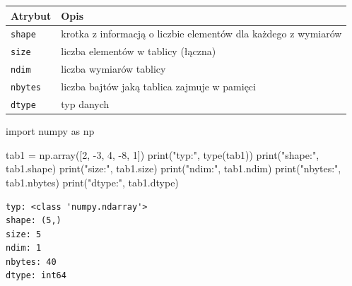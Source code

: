 \documentclass[
  letterpaper,
  DIV=11,
  numbers=noendperiod]{scrreprt}
\newenvironment{Shaded}{\begin{snugshade}}{\end{snugshade}}
\newcommand{\BuiltInTok}[1]{\textcolor[rgb]{0.00,0.23,0.31}{#1}}
\newcommand{\DecValTok}[1]{\textcolor[rgb]{0.68,0.00,0.00}{#1}}
\newcommand{\ImportTok}[1]{\textcolor[rgb]{0.00,0.46,0.62}{#1}}
\newcommand{\NormalTok}[1]{\textcolor[rgb]{0.00,0.23,0.31}{#1}}
\newcommand{\OperatorTok}[1]{\textcolor[rgb]{0.37,0.37,0.37}{#1}}
\newcommand{\StringTok}[1]{\textcolor[rgb]{0.13,0.47,0.30}{#1}}
\begin{document}
\begin{longtable}[]{@{}
  >{\raggedright\arraybackslash}p{}
  >{\raggedright\arraybackslash}p{}@{}}
\toprule\noalign{}
\begin{minipage}[b]{\linewidth}\raggedright
Atrybut
\end{minipage} & \begin{minipage}[b]{\linewidth}\raggedright
Opis
\end{minipage} \\
\midrule\noalign{}
\endhead
\bottomrule\noalign{}
\endlastfoot
\texttt{shape} & krotka z informacją o liczbie elementów dla każdego z
wymiarów \\
\texttt{size} & liczba elementów w tablicy (łączna) \\
\texttt{ndim} & liczba wymiarów tablicy \\
\texttt{nbytes} & liczba bajtów jaką tablica zajmuje w pamięci \\
\texttt{dtype} & typ danych \\
\end{longtable}

\begin{Shaded}
\begin{Highlighting}[]
\ImportTok{import}\NormalTok{ numpy }\ImportTok{as}\NormalTok{ np}

\NormalTok{tab1 }\OperatorTok{=}\NormalTok{ np.array([}\DecValTok{2}\NormalTok{, }\OperatorTok{{-}}\DecValTok{3}\NormalTok{, }\DecValTok{4}\NormalTok{, }\OperatorTok{{-}}\DecValTok{8}\NormalTok{, }\DecValTok{1}\NormalTok{])}
\BuiltInTok{print}\NormalTok{(}\StringTok{"typ:"}\NormalTok{, }\BuiltInTok{type}\NormalTok{(tab1))}
\BuiltInTok{print}\NormalTok{(}\StringTok{"shape:"}\NormalTok{, tab1.shape)}
\BuiltInTok{print}\NormalTok{(}\StringTok{"size:"}\NormalTok{, tab1.size)}
\BuiltInTok{print}\NormalTok{(}\StringTok{"ndim:"}\NormalTok{, tab1.ndim)}
\BuiltInTok{print}\NormalTok{(}\StringTok{"nbytes:"}\NormalTok{, tab1.nbytes)}
\BuiltInTok{print}\NormalTok{(}\StringTok{"dtype:"}\NormalTok{, tab1.dtype)}
\end{Highlighting}
\end{Shaded}

\begin{verbatim}
typ: <class 'numpy.ndarray'>
shape: (5,)
size: 5
ndim: 1
nbytes: 40
dtype: int64
\end{verbatim}
\end{document}
